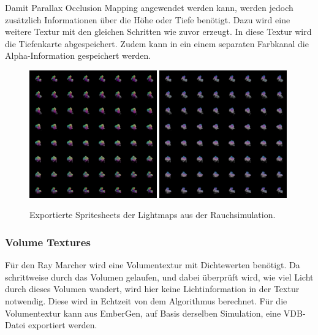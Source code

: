 Damit Parallax Occlusion Mapping angewendet werden kann, werden jedoch zusätzlich Informationen über die Höhe oder Tiefe benötigt.
Dazu wird eine weitere Textur mit den gleichen Schritten wie zuvor erzeugt. In diese Textur wird die Tiefenkarte abgespeichert. Zudem kann in ein einem separaten
Farbkanal die Alpha-Information gespeichert werden.


\begin{figure}[h]
	\centering
	\includegraphics[width=0.49\textwidth]{Grafiken/Implementation/Lightmaps/smokeSim_T1.png}
	\includegraphics[width=0.49\textwidth]{Grafiken/Implementation/Lightmaps/smokeSim_T2.png}
	\begin{footnotesize}
		\caption{Exportierte Spritesheets der Lightmaps aus der Rauchsimulation. }
		\label{fig:flipbook}
	\end{footnotesize}
\end{figure}


\subsubsection{Volume Textures}
Für den Ray Marcher wird eine Volumentextur mit Dichtewerten benötigt. Da schrittweise durch das Volumen gelaufen, und dabei überprüft wird, wie viel Licht
durch dieses Volumen wandert, wird hier keine Lichtinformation in der Textur notwendig. Diese wird in Echtzeit von dem Algorithmus berechnet.
Für die Volumentextur kann aus EmberGen, auf Basis derselben Simulation, eine VDB-Datei exportiert werden.

